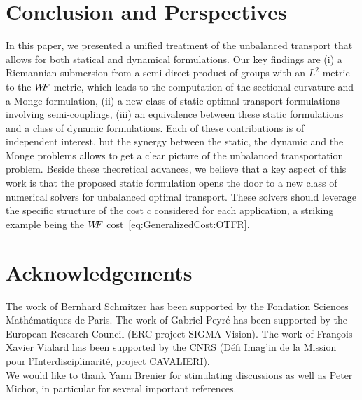
\section*{Conclusion and Perspectives}

In this paper, we presented a unified treatment of the unbalanced transport that allows for both statical and dynamical formulations. Our key findings are (i) a Riemannian submersion from a semi-direct product of groups with an $L^2$ metric to the $W\! \! F$ metric, which leads to the computation of the sectional curvature and a Monge formulation, (ii) a new class of static optimal transport formulations involving semi-couplings, (iii) an equivalence between these static formulations and a class of dynamic formulations. Each of these contributions is of independent interest, but the synergy between the static, the dynamic and the Monge problems allows to get a clear picture of the unbalanced transportation problem. Beside these theoretical advances, we believe that a key aspect of this work is that the proposed static formulation opens the door to a new class of numerical solvers for unbalanced optimal transport. These solvers should leverage the specific structure of the cost $c$ considered for each application, a striking example being the $W\! \! F$ cost~\eqref{eq:GeneralizedCost:OTFR}.


\section*{Acknowledgements}

The work of Bernhard Schmitzer has been supported by the Fondation Sciences Math\'ematiques de Paris. 
%
The work of Gabriel Peyr\'e has been supported by the European Research Council (ERC project SIGMA-Vision). 
%
The work of Fran\c{c}ois-Xavier Vialard has been supported by the CNRS (D\'efi Imag'in de la Mission pour l'Interdisciplinarit\'e, project CAVALIERI).
%
\\
We would like to thank Yann Brenier for stimulating discussions as well as Peter Michor, in particular for several important references.

